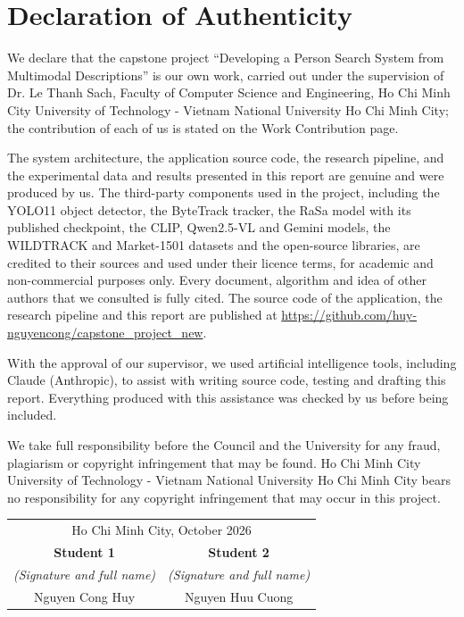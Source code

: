 \chapter*{Declaration of Authenticity}

We declare that the capstone project ``Developing a Person Search System from Multimodal Descriptions'' is our own work, carried out under the supervision of Dr. Le Thanh Sach, Faculty of Computer Science and Engineering, Ho Chi Minh City University of Technology - Vietnam National University Ho Chi Minh City; the contribution of each of us is stated on the Work Contribution page.

The system architecture, the application source code, the research pipeline, and the experimental data and results presented in this report are genuine and were produced by us. The third-party components used in the project, including the YOLO11 object detector, the ByteTrack tracker, the RaSa model with its published checkpoint, the CLIP, Qwen2.5-VL and Gemini models, the WILDTRACK and Market-1501 datasets and the open-source libraries, are credited to their sources and used under their licence terms, for academic and non-commercial purposes only. Every document, algorithm and idea of other authors that we consulted is fully cited. The source code of the application, the research pipeline and this report are published at \url{https://github.com/huy-nguyencong/capstone_project_new}.

With the approval of our supervisor, we used artificial intelligence tools, including Claude (Anthropic), to assist with writing source code, testing and drafting this report. Everything produced with this assistance was checked by us before being included.

We take full responsibility before the Council and the University for any fraud, plagiarism or copyright infringement that may be found. Ho Chi Minh City University of Technology - Vietnam National University Ho Chi Minh City bears no responsibility for any copyright infringement that may occur in this project.

\begin{flushright}
\begin{tabular}{c c}
    \multicolumn{2}{c}{Ho Chi Minh City, October 2026} \\
    \textbf{Student 1} & \textbf{Student 2} \\
    \textit{(Signature and full name)} & \textit{(Signature and full name)} \\[1.3cm]
    Nguyen Cong Huy & Nguyen Huu Cuong
\end{tabular}
\end{flushright}

